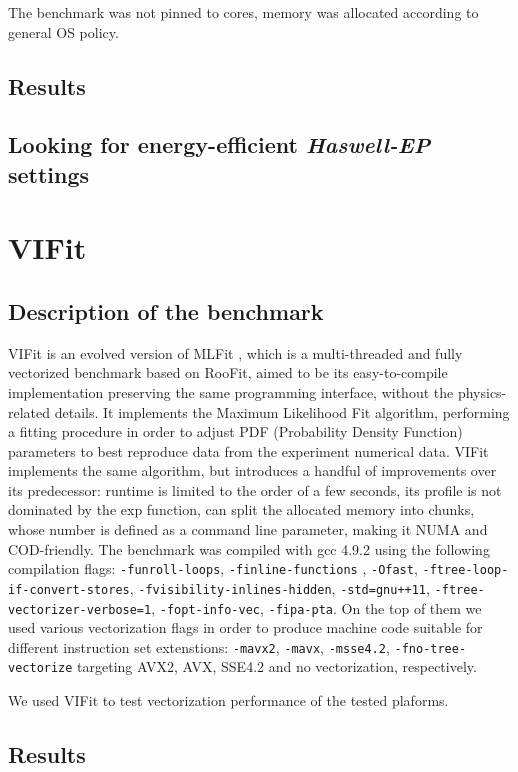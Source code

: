\documentclass[a4paper]{jpconf}
\begin{document}
The benchmark was not pinned to cores, memory was allocated according to general OS policy.
\subsection{Results}

\subsection{Looking for energy-efficient \textit{Haswell-EP} settings} \label{sec:energy-efficiency}


\section{VIFit}

\subsection{Description of the benchmark}
VIFit is an evolved version of MLFit \cite{mlfit}, which is a multi-threaded and fully vectorized benchmark based on RooFit, aimed to be its easy-to-compile implementation preserving the same programming interface, without the physics-related details. It implements the Maximum Likelihood Fit algorithm, performing a fitting procedure in order to adjust PDF (Probability Density Function) parameters to best reproduce data from the experiment numerical data.
VIFit implements the same algorithm, but introduces a handful of improvements over its predecessor: runtime is limited to the order of a few seconds, its profile is not dominated by the exp function, can split the allocated memory into chunks, whose number is defined as a command line parameter, making it NUMA and COD-friendly.
The benchmark was compiled with gcc 4.9.2 using the following compilation flags: \verb|-funroll-loops|, \verb|-finline-functions| , \verb|-Ofast|, \verb|-ftree-loop-if-convert-stores|, \verb|-fvisibility-inlines-hidden|, \verb|-std=gnu++11|, \verb|-ftree-vectorizer-verbose=1|, \verb|-fopt-info-vec|, \verb|-fipa-pta|. On the top of them we used various vectorization flags in order to produce machine code suitable for different instruction set extenstions: \verb!-mavx2!, \verb!-mavx!, \verb!-msse4.2!, \verb!-fno-tree-vectorize! targeting AVX2, AVX, SSE4.2 and no vectorization, respectively.

We used VIFit to test vectorization performance of the tested plaforms. 
\subsection{Results}
\end{document}
